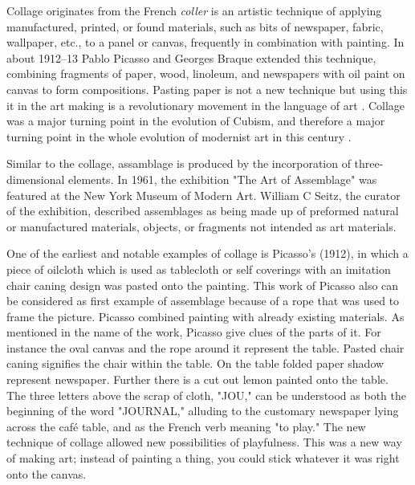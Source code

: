 Collage originates from the French \textit{coller} is an artistic technique of applying manufactured, printed, or found materials, such as bits of newspaper, fabric, wallpaper, etc., to a panel or canvas, frequently in combination with painting. In about 1912–13 Pablo Picasso and Georges Braque extended this technique, combining fragments of paper, wood, linoleum, and newspapers with oil paint on canvas to form compositions. Pasting paper is not a new technique but using this it in the art making is a revolutionary movement in the  language of art \citep{waldman1992collage}. Collage was a major turning point in the evolution of Cubism, and therefore a major turning point in the whole evolution of modernist art in this century \citep{greenberg1984collage}. 

Similar to the collage, assamblage is produced by the incorporation of three-dimensional elements. In 1961, the exhibition "The Art of Assemblage" was featured at the New York Museum of Modern Art. William C Seitz, the curator of the exhibition, described assemblages as being made up of preformed natural or manufactured materials, objects, or fragments not intended as art materials. 


One of the earliest and notable examples of collage is Picasso’s  (1912), in which a piece of oilcloth which is used as tablecloth or self coverings with an imitation chair caning design was pasted onto the painting. This work of Picasso also can be considered as first example of assemblage because of a rope that was used to frame the picture. Picasso combined painting with already existing materials. As mentioned in the name of the work, Picasso give clues of the parts of it. For instance the oval canvas and the rope around it represent the table. Pasted chair caning signifies the chair within the table. On the table folded paper shadow represent newspaper. Further there is a cut out lemon painted onto the table. The three letters above the scrap of cloth, "JOU," can be understood as both the beginning of the word "JOURNAL," alluding to the customary newspaper lying across the café table, and as the French verb meaning "to play." The new technique of collage allowed new possibilities of playfulness. This was a new way of making art; instead of painting a thing, you could stick whatever it was right onto the canvas.

